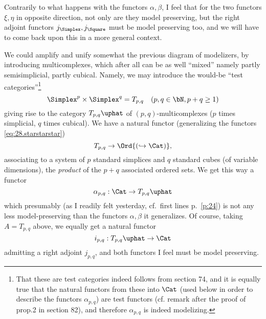 Contrarily to what happens with the functors $\alpha,\beta$, I feel
that for the two functors $\xi,\eta$ in opposite direction, not only
are they model preserving, but the right adjoint functors
$j_\Simplex,j_\Square$ must be model preserving too, and we will have to
come back upon this in a more general context.

We could amplify and unify somewhat the previous diagram of
modelizers, by introducing multicomplexes, which after all can be as
well ``mixed'' namely partly semisimplicial, partly cubical. Namely,
we may introduce the would-be ``test categories''\footnote{That these are test categories indeed follows from section 74, and it is equally true that the natural functors from these into $\Cat$ (used below in order to describe the functors $\alpha_{p, q}$) are test functors (cf. remark after the proof of prop.2 in section 82), and therefore $\alpha_{p, q}$ is indeed modelizing.}
\[ \Simplex^p \times \Simplex^q = T_{p,q}\quad (p,q\in\bN, p+q\ge1)\]
giving rise to the category ${T_{p,q}}\uphat$ of
$(p,q)$-multicomplexes ($p$ times simplicial, $q$ times cubical). We
have a natural functor (generalizing the functors
\eqref{eq:28.starstarstar})
\[ T_{p,q} \to \Ord {( \hookrightarrow \Cat)},\]
associating to a system of $p$ standard simplices and $q$ standard
cubes (of variable dimensions), the \emph{product} of the $p+q$
associated ordered sets. We get this way a functor
\[\alpha_{p,q} : \Cat \to {T_{p,q}}\uphat\]
which presumably (as I readily felt yesterday, cf.\
first lines p.~\ref{p:24})
is not any less model-preserving than the functors
$\alpha,\beta$ it generalizes. Of course, taking $A=T_{p,q}$ above, we
equally get a natural functor
\[i_{p,q} : {T_{p,q}}\uphat \to \Cat \]
admitting a right adjoint $j_{p,q}$, and both functors I feel must be
model preserving.

